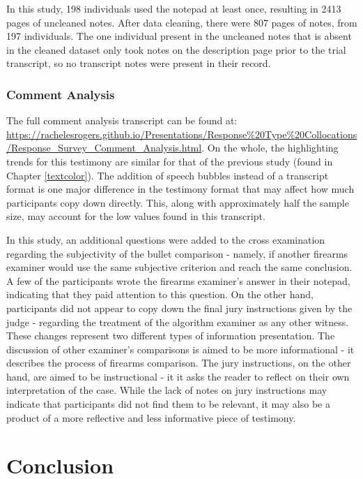\documentclass[print]{nuthesis}
\begin{document}
In this study, 198 individuals used the notepad at least once, resulting in 2413 pages of uncleaned notes.
After data cleaning, there were 807 pages of notes, from 197 individuals.
The one individual present in the uncleaned notes that is absent in the cleaned dataset only took notes on the description page prior to the trial transcript, so no transcript notes were present in their record.

\hypertarget{comment-analysis}{%
\subsubsection{Comment Analysis}\label{comment-analysis}}

The full comment analysis transcript can be found at: \url{https://rachelesrogers.github.io/Presentations/Response\%20Type\%20Collocations/Response_Survey_Comment_Analysis.html}.
On the whole, the highlighting trends for this testimony are similar for that of the previous study (found in Chapter \ref{textcolor}).
The addition of speech bubbles instead of a transcript format is one major difference in the testimony format that may affect how much participants copy down directly.
This, along with approximately half the sample size, may account for the low values found in this transcript.

In this study, an additional questions were added to the cross examination regarding the subjectivity of the bullet comparison - namely, if another firearms examiner would use the same subjective criterion and reach the same conclusion.
A few of the participants wrote the firearms examiner's answer in their notepad, indicating that they paid attention to this question.
On the other hand, participants did not appear to copy down the final jury instructions given by the judge - regarding the treatment of the algorithm examiner as any other witness.
These changes represent two different types of information presentation.
The discussion of other examiner's comparisons is aimed to be more informational - it describes the process of firearms comparison.
The jury instructions, on the other hand, are aimed to be instructional - it it asks the reader to reflect on their own interpretation of the case.
While the lack of notes on jury instructions may indicate that participants did not find them to be relevant, it may also be a product of a more reflective and less informative piece of testimony.

\hypertarget{conclusion-2}{%
\section{Conclusion}\label{conclusion-2}}
\end{document}

